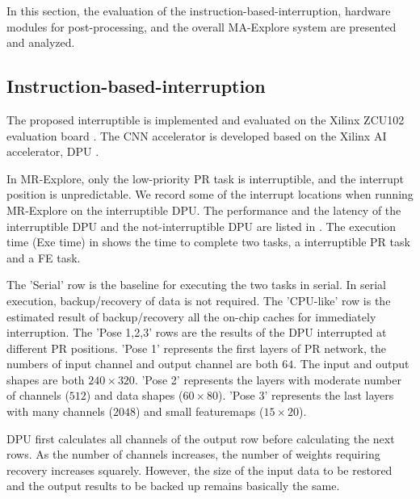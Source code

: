 \label{sec:experiments}

In this section, the evaluation of the instruction-based-interruption, hardware modules for post-processing, and the overall MA-Explore system are presented and analyzed.

\subsection{ Instruction-based-interruption}

The proposed interruptible is implemented and evaluated on the Xilinx ZCU102 evaluation board \cite{zcu102}. The CNN accelerator is developed based on the Xilinx AI accelerator, DPU \cite{dpu}. 

In MR-Explore, only the low-priority PR task is interruptible, and the interrupt position is unpredictable.
We record some of the interrupt locations when running MR-Explore on the interruptible DPU. The performance and the latency of the interruptible DPU and the not-interruptible DPU are listed in . 
The execution time (Exe time) in  shows the time to complete two tasks, a interruptible PR task and a FE task.

The 'Serial' row is the baseline for executing the two tasks in serial. In serial execution, backup/recovery of data is not required. The 'CPU-like' row is the estimated result of backup/recovery all the on-chip caches for immediately interruption. The 'Pose 1,2,3' rows are the results of the DPU interrupted at different  PR positions. 'Pose 1' represents the first layers of PR network, the numbers of input channel and output channel are both $64$. The input and output shapes are both $240 \times 320$. 'Pose 2' represents the layers with moderate number of channels ($ 512 $) and data shapes ($ 60 \times 80 $). 'Pose 3' represents the last layers with many channels ($ 2048 $) and small featuremaps ($ 15 \times 20$).

DPU first calculates all channels of the output row before calculating the next rows. As the number of channels increases, the number of weights requiring recovery increases squarely. However, the size of the input data to be restored and the output results to be backed up remains basically the same.


